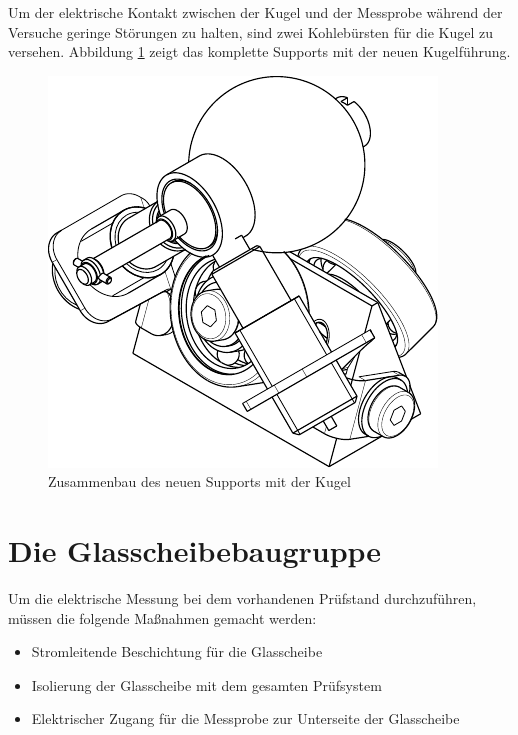 Um der elektrische Kontakt zwischen der Kugel und der Messprobe während der Versuche geringe Störungen zu halten, sind zwei Kohlebürsten für die Kugel zu versehen.
Abbildung \ref{fig:das_komplette_kugelsupports} zeigt das komplette Supports mit der neuen Kugelführung.
\begin{figure}[htb]
    \centering
    \includegraphics[]{./images/kugelsupport_full.pdf}
    \caption{Zusammenbau des neuen Supports mit der Kugel}
    \label{fig:das_komplette_kugelsupports}
\end{figure}
%

\section{Die Glasscheibebaugruppe}
\label{sec:die_glasscheibebaugruppe}

Um die elektrische Messung bei dem vorhandenen Prüfstand durchzuführen, müssen die folgende Maßnahmen gemacht werden:
\begin{itemize}
    \item Stromleitende Beschichtung für die Glasscheibe
    \item Isolierung der Glasscheibe mit dem gesamten Prüfsystem
    \item Elektrischer Zugang für die Messprobe zur Unterseite der Glasscheibe
\end{itemize}

